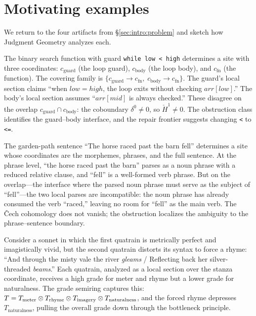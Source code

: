 \section{Motivating examples}
\label{sec:intro:examples}

We return to the four artifacts from \S\ref{sec:intro:problem} and
sketch how Judgment Geometry analyzes each.

\begin{example}
\label{ex:intro:program}
The binary search function with guard \texttt{while low < high}
determines a site with three coordinates: $c_{\mathrm{guard}}$ (the
loop guard), $c_{\mathrm{body}}$ (the loop body), and
$c_{\mathrm{fn}}$ (the function).  The covering family is
$\{c_{\mathrm{guard}} \to c_{\mathrm{fn}},\; c_{\mathrm{body}} \to
c_{\mathrm{fn}}\}$.  The guard's local section claims ``when
$\mathit{low} = \mathit{high}$, the loop exits without checking
$\mathit{arr}[\mathit{low}]$.''  The body's local section assumes
``$\mathit{arr}[\mathit{mid}]$ is always checked.''  These disagree on
the overlap $c_{\mathrm{guard}} \cap c_{\mathrm{body}}$: the
coboundary $\delta^0 \neq 0$, so $\check{H}^1 \neq 0$.  The
obstruction class identifies the guard--body interface, and the repair
frontier suggests changing \texttt{<} to \texttt{<=}.
\end{example}

\begin{example}
\label{ex:intro:sentence}
The garden-path sentence ``The horse raced past the barn fell'' determines
a site whose coordinates are the morphemes, phrases, and the full
sentence.  At the phrase level, ``the horse raced past the barn''
parses as a noun phrase with a reduced relative clause, and ``fell'' is
a well-formed verb phrase.  But on the overlap---the interface where
the parsed noun phrase must serve as the subject of ``fell''---the two
local parses are incompatible: the noun phrase has already consumed the
verb ``raced,'' leaving no room for ``fell'' as the main verb.  The
\v{C}ech cohomology does not vanish; the obstruction localizes the
ambiguity to the phrase--sentence boundary.
\end{example}

\begin{example}
\label{ex:intro:poem}
Consider a sonnet in which the first quatrain is metrically perfect
and imagistically vivid, but the second quatrain distorts its syntax
to force a rhyme: ``And through the misty vale the river \emph{gleams}
/ Reflecting back her silver-threaded \emph{beams}.''  Each quatrain,
analyzed as a local section over the stanza coordinate, receives a
high grade for meter and rhyme but a lower grade for naturalness.  The
grade semiring captures this: $T = T_{\text{meter}} \otimes
T_{\text{rhyme}} \otimes T_{\text{imagery}} \otimes T_{\text{naturalness}}$,
and the forced rhyme depresses $T_{\text{naturalness}}$, pulling the
overall grade down through the bottleneck principle.
\end{example}


